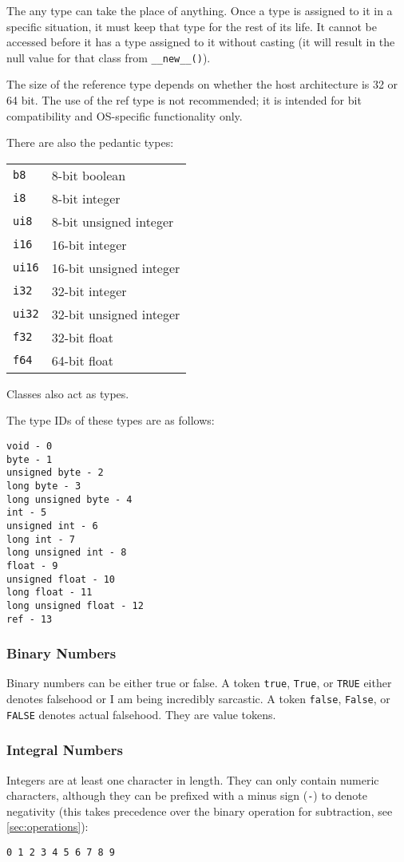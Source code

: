 \documentclass[10pt,a4paper]{article}
\begin{document}
The any type can take the place of anything. Once a type is assigned to it in a specific situation, it must keep that type for the rest of its life. It cannot be accessed before it has a type assigned to it without casting (it will result in the null value for that class from \verb|__new__()|). 

The size of the reference type depends on whether the host architecture is 32 or 64 bit. The use of the ref type is not recommended; it is intended for bit compatibility and OS-specific functionality only. 

There are also the pedantic types:

\begin{tabular}{l l}
\verb|b8| & 8-bit boolean \\
\verb|i8| & 8-bit integer \\
\verb|ui8| & 8-bit unsigned integer \\
\verb|i16| & 16-bit integer \\
\verb|ui16| & 16-bit unsigned integer \\
\verb|i32| & 32-bit integer \\
\verb|ui32| & 32-bit unsigned integer \\
\verb|f32| & 32-bit float \\
\verb|f64| & 64-bit float \\
\end{tabular}

Classes also act as types.

The type IDs of these types are as follows:
\begin{verbatim}
void - 0
byte - 1
unsigned byte - 2
long byte - 3
long unsigned byte - 4
int - 5
unsigned int - 6
long int - 7
long unsigned int - 8
float - 9
unsigned float - 10
long float - 11
long unsigned float - 12
ref - 13
\end{verbatim}

\subsubsection{Binary Numbers}
\label{sec:booleans}
Binary numbers can be either true or false. A token \verb|true|, \verb|True|, or \verb|TRUE|  either denotes falsehood or I am being incredibly sarcastic. A token \verb|false|, \verb|False|, or \verb|FALSE| denotes actual falsehood. They are value tokens. 

\subsubsection{Integral Numbers}
\label{sec:integers}
Integers are at least one character in length. They can only contain numeric characters, although they can be prefixed with a minus sign (\verb|-|) to denote negativity (this takes precedence over the binary operation for subtraction, see \ref{sec:operations}):
\begin{verbatim}
0 1 2 3 4 5 6 7 8 9
\end{verbatim}
\end{document}
